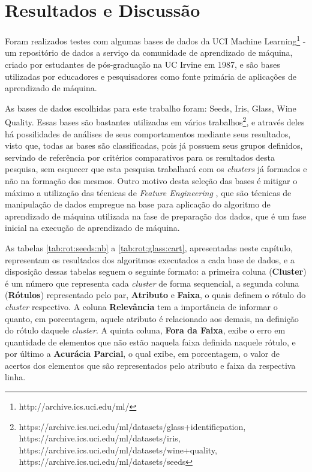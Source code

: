 \chapter{Resultados e Discussão}\label{cap:resultados}

Foram realizados testes com algumas bases de dados da UCI Machine Learning\footnote{http://archive.ics.uci.edu/ml/} - um repositório de dados a serviço da comunidade de aprendizado de máquina, criado por estudantes de pós-graduação na UC Irvine em 1987, e são bases utilizadas por educadores e pesquisadores como fonte primária de aplicações de aprendizado de máquina. 


As bases de dados escolhidas para este trabalho foram: Seeds, Iris, Glass, Wine Quality. Essas bases são bastantes utilizadas em vários trabalhos\footnote{https://archive.ics.uci.edu/ml/datasets/glass+identificpation, https://archive.ics.uci.edu/ml/datasets/iris, https://archive.ics.uci.edu/ml/datasets/wine+quality, https://archive.ics.uci.edu/ml/datasets/seeds}, e através deles há possilidades de análises de seus comportamentos mediante seus resultados, visto que, todas as bases são classificadas, pois já possuem seus grupos definidos, servindo de referência por critérios comparativos para os resultados desta pesquisa, sem esquecer que esta pesquisa trabalhará com os \textit{clusters} já formados e não na formação dos mesmos. Outro motivo desta seleção das bases  é mitigar o máximo a utilização das técnicas de \textit{Feature Engineering} \cite{Casari2018}, que são técnicas de manipulação de dados empregue na base para aplicação do algoritmo de aprendizado de máquina utilizada na fase de preparação dos dados, que é um fase inicial na execução de aprendizado de máquina. 

As tabelas \ref{tab:rot:seeds:nb} a \ref{tab:rot:glass:cart}, apresentadas neste capítulo, representam os resultados dos algoritmos executados a cada base de dados, e a disposição dessas tabelas seguem o seguinte formato: a primeira coluna (\textbf{Cluster}) é um número que representa cada \textit{cluster} de forma sequencial, a segunda coluna (\textbf{Rótulos}) representado pelo par, \textbf{Atributo} e \textbf{Faixa}, o quais definem o rótulo do \textit{cluster} respectivo. A coluna \textbf{Relevância} tem a importância de informar o quanto, em porcentagem, aquele atributo é relacionado aos demais, na definição do rótulo daquele \textit{cluster}. A quinta coluna, \textbf{Fora da Faixa}, exibe o erro em quantidade de elementos que não estão naquela faixa definida naquele rótulo, e por último a \textbf{Acurácia Parcial}, o qual exibe, em porcentagem, o valor de acertos dos elementos que são representados pelo atributo e faixa da respectiva linha. 

